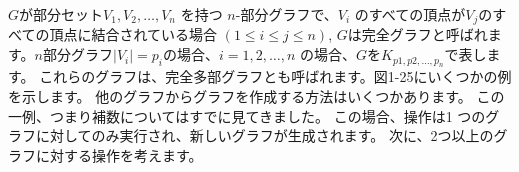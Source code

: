 $G$が部分セット$V_1, V_2, \dots, V_n$ を持つ $n$-部分グラフで、$V_i$ のすべての頂点が$V_j$のすべての頂点に結合されている場合 
$(1 \leq  i \leq  j \leq n)$, $G$は完全グラフと呼ばれます。$n$部分グラフ$|V_i| = p_i$の場合、$i = 1, 2, \dots, n$ の場合、$G$を$K_{p1,p2,\dots, p_n}$で表します。
これらのグラフは、完全多部グラフとも呼ばれます。図1-25にいくつかの例を示します。
他のグラフからグラフを作成する方法はいくつかあります。 この一例、つまり補数についてはすでに見てきました。
この場合、操作は1 つのグラフに対してのみ実行され、新しいグラフが生成されます。 
次に、2つ以上のグラフに対する操作を考えます。